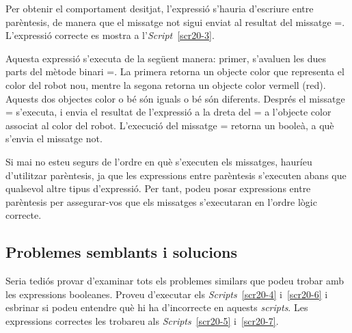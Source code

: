 Per obtenir el comportament desitjat, l'expressió s'hauria d'escriure entre parèntesis, de manera que el missatge \textsf{not} sigui enviat al resultat del missatge \textsf{=}. L'expressió correcte es mostra a l'\emph{Script}~\ref{scr20-3}.


Aquesta expressió s'executa de la següent manera: primer, s'avaluen les dues parts del mètode binari \textsf{=}. La primera retorna un objecte color que representa el color del robot nou, mentre la segona retorna un objecte color vermell (\textsf{red}). Aquests dos objectes color o bé són iguals o bé són diferents. Després el missatge \textsf{=} s'executa, i envia el resultat de l'expressió a la dreta del \textsf{=} a l'objecte color associat al color del robot. L'execució del missatge \textsf{=} retorna un booleà, a què s'envia el missatge \textsf{not}.

Si mai no esteu segurs de l'ordre en què s'executen els missatges, hauríeu d'utilitzar parèntesis, ja que les expressions entre parèntesis s'executen abans que qualsevol altre tipus d'expressió. Per tant, podeu posar expressions entre parèntesis per assegurar-vos que els missatges s'executaran en l'ordre lògic correcte.

\subsection{Problemes semblants i solucions}

Seria tediós provar d'examinar tots els problemes similars que podeu trobar amb les expressions booleanes. Proveu d'executar els \emph{Scripts}~\ref{scr20-4} i~\ref{scr20-6} i esbrinar si podeu entendre què hi ha d'incorrecte en aquests \emph{scripts}. Les expressions correctes les trobareu als \emph{Scripts}~\ref{scr20-5} i~\ref{scr20-7}.


